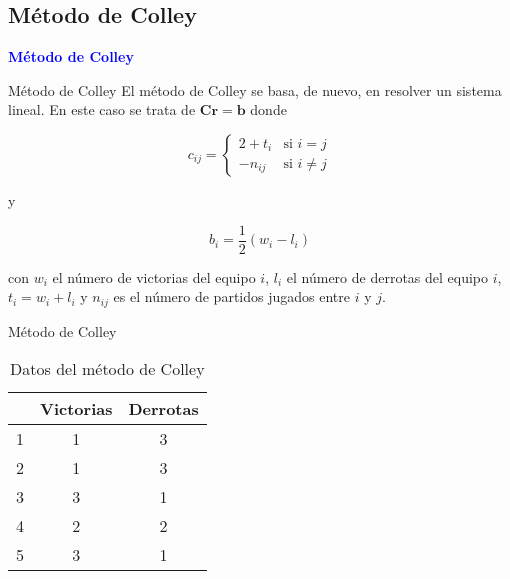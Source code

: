 \documentclass[10pt,hyperref={unicode}]{beamer}
\begin{document}
	\subsection{Método de Colley}
	
	\begin{frame}
		\begin{center}
			\Huge\textbf{\textsf{\textcolor{blue}{Método de Colley}}}
		\end{center}
	\end{frame}
	
	\begin{frame}{Método de Colley}
		El método de Colley se basa, de nuevo, en resolver un sistema lineal. En este caso se trata de $\mathbf{Cr} = \mathbf{b}$ donde
		
		\[ c_{ij} = \begin{cases}
		2 + t_i & \text{si } i = j \\
		-n_{ij} & \text{si } i \neq j  
		\end{cases} \]
		
		y 
		
		\[ b_i = \dfrac{1}{2}(w_i - l_i) \]
		
		con $w_i$ el número de victorias del equipo $i$, $l_i$ el número de derrotas del equipo $i$, $t_i = w_i + l_i$ y $n_{ij}$ es el número de partidos jugados entre $i$ y $j$.
	\end{frame}
	
	\begin{frame}{Método de Colley}
		\begin{ejemplo}
			\begin{table}[h]
				\centering
				\caption{Datos del método de Colley}
				\label{tbl:colley}
				\begin{tabular}{@{}ccc@{}}
					\cmidrule(l){2-3}
					& Victorias & Derrotas \\ \midrule
					1 & 1         & 3        \\
					2 & 1         & 3        \\
					3 & 3         & 1        \\
					4 & 2         & 2        \\
					5 & 3         & 1        \\ \bottomrule
				\end{tabular}
			\end{table}
		\end{ejemplo}
			
	\end{frame}
	
\end{document}
